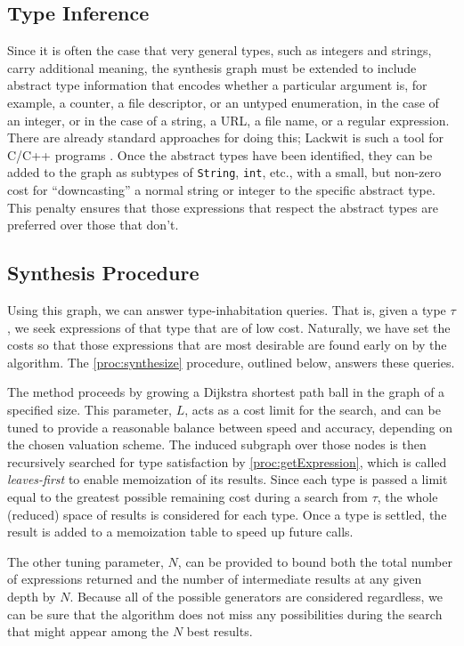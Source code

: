 \subsection{Type Inference}

Since it is often the case that very general types, such as integers and strings, carry additional meaning, the synthesis graph must be extended to include abstract type information that encodes whether a particular argument is, for example, a counter, a file descriptor, or an untyped enumeration, in the case of an integer, or in the case of a string, a URL, a file name, or a regular expression. There are already standard approaches for doing this; Lackwit is such a tool for C/C++ programs \cite{DBLP:conf/icse/OCallahanJ97}. Once the abstract types have been identified, they can be added to the graph as subtypes of \texttt{String}, \texttt{int}, etc., with a small, but non-zero cost for ``downcasting'' a normal string or integer to the specific abstract type. This penalty ensures that those expressions that respect the abstract types are preferred over those that don't.

\subsection{Synthesis Procedure}

Using this graph, we can answer type-inhabitation queries. That is, given a type $\tau$, we seek expressions of that type that are of low cost. Naturally, we have set the costs so that those expressions that are most desirable are found early on by the algorithm. The \ref{proc:synthesize} procedure, outlined below, answers these queries.

The method proceeds by growing a Dijkstra shortest path ball in the graph of a specified size. This parameter, $L$, acts as a cost limit for the search, and can be tuned to provide a reasonable balance between speed and accuracy, depending on the chosen valuation scheme. The induced subgraph over those nodes is then recursively searched for type satisfaction by \ref{proc:getExpression}, which is called \textit{leaves-first} to enable memoization of its results. Since each type is passed a limit equal to the greatest possible remaining cost during a search from $\tau$, the whole (reduced) space of results is considered for each type. Once a type is settled, the result is added to a memoization table to speed up future calls.

The other tuning parameter, $N$, can be provided to bound both the total number of expressions returned and the number of intermediate results at any given depth by $N$. Because all of the possible generators are considered regardless, we can be sure that the algorithm does not miss any possibilities during the search that might appear among the $N$ best results.

